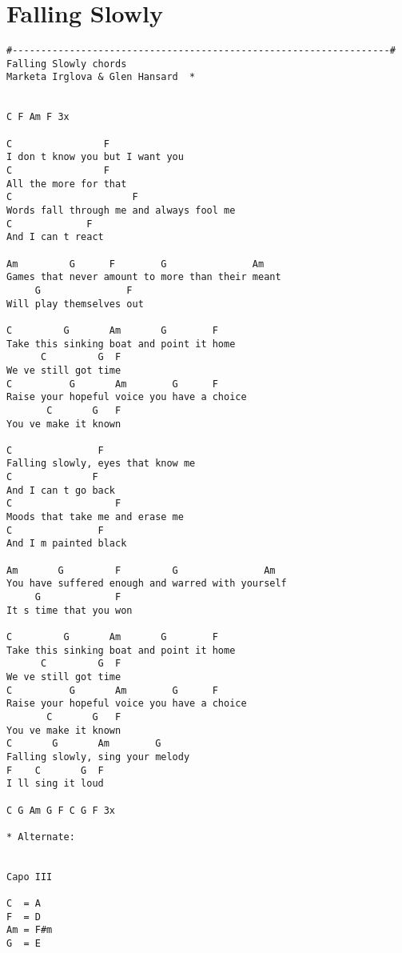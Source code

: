 \documentclass[leqno]{memoir}
\begin{document}
\chapter{Falling Slowly}
\begin{verbatim}
#------------------------------------------------------------------#
Falling Slowly chords
Marketa Irglova & Glen Hansard  *


C F Am F 3x

C                F
I don t know you but I want you
C                F
All the more for that
C                     F
Words fall through me and always fool me
C             F
And I can t react

Am         G      F        G               Am
Games that never amount to more than their meant
     G               F 
Will play themselves out

C         G       Am       G        F
Take this sinking boat and point it home
      C         G  F
We ve still got time
C          G       Am        G      F
Raise your hopeful voice you have a choice
       C       G   F
You ve make it known

C               F 
Falling slowly, eyes that know me
C              F
And I can t go back
C                  F
Moods that take me and erase me
C               F
And I m painted black

Am       G         F         G               Am
You have suffered enough and warred with yourself
     G             F
It s time that you won

C         G       Am       G        F
Take this sinking boat and point it home
      C         G  F
We ve still got time
C          G       Am        G      F
Raise your hopeful voice you have a choice
       C       G   F
You ve make it known
C       G       Am        G
Falling slowly, sing your melody
F    C       G  F
I ll sing it loud

C G Am G F C G F 3x

* Alternate:


Capo III

C  = A
F  = D
Am = F#m
G  = E

\end{verbatim}
\newpage
\end{document}
